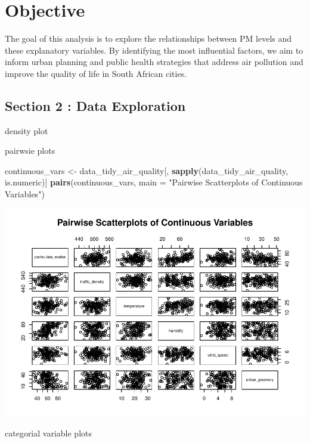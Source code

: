 \documentclass[12pt,halfline,a4paper,]{ouparticle}
\newenvironment{Shaded}{\begin{snugshade}}{\end{snugshade}}
\newcommand{\AttributeTok}[1]{\textcolor[rgb]{0.13,0.29,0.53}{#1}}
\newcommand{\FunctionTok}[1]{\textcolor[rgb]{0.13,0.29,0.53}{\textbf{#1}}}
\newcommand{\NormalTok}[1]{#1}
\newcommand{\OtherTok}[1]{\textcolor[rgb]{0.56,0.35,0.01}{#1}}
\newcommand{\StringTok}[1]{\textcolor[rgb]{0.31,0.60,0.02}{#1}}
\begin{document}
\section{Objective}\label{objective}

\hfill\break
The goal of this analysis is to explore the relationships between PM
levels and these explanatory variables. By identifying the most
influential factors, we aim to inform urban planning and public health
strategies that address air pollution and improve the quality of life in
South African cities.

\subsection{Section 2 : Data
Exploration}\label{section-2-data-exploration}

density plot

pairwsie plots

\begin{Shaded}
\begin{Highlighting}[]
\NormalTok{continuous\_vars }\OtherTok{\textless{}{-}}\NormalTok{ data\_tidy\_air\_quality[, }\FunctionTok{sapply}\NormalTok{(data\_tidy\_air\_quality, is.numeric)]}
\FunctionTok{pairs}\NormalTok{(continuous\_vars, }\AttributeTok{main =} \StringTok{"Pairwise Scatterplots of Continuous Variables"}\NormalTok{)}
\end{Highlighting}
\end{Shaded}

\includegraphics{Report_files/figure-latex/unnamed-chunk-1-1.pdf}

categorial variable plots
\end{document}
